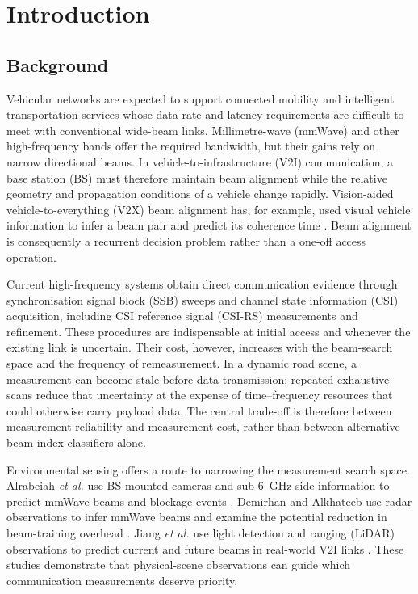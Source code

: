 \chapter{Introduction}
\label{ch:introduction}

\section{Background}
\label{sec:introduction-background}

Vehicular networks are expected to support connected mobility and intelligent
transportation services whose data-rate and latency requirements are difficult
to meet with conventional wide-beam links.  Millimetre-wave (mmWave) and other
high-frequency bands offer the required bandwidth, but their gains rely on
narrow directional beams.  In vehicle-to-infrastructure (V2I) communication, a
base station (BS) must therefore maintain beam alignment while the relative
geometry and propagation conditions of a vehicle change rapidly.  Vision-aided
vehicle-to-everything (V2X) beam alignment has, for example, used visual vehicle information to infer a
beam pair and predict its coherence time \cite{xu2022computervisionaidedmmwave}.
Beam alignment is consequently a recurrent decision problem rather than a
one-off access operation.

Current high-frequency systems obtain direct communication evidence through
synchronisation signal block (SSB) sweeps and channel state information (CSI)
acquisition, including CSI reference signal (CSI-RS) measurements and
refinement.  These procedures are indispensable at initial
access and whenever the existing link is uncertain.  Their cost, however,
increases with the beam-search space and the frequency of remeasurement.  In a
dynamic road scene, a measurement can become stale before data transmission;
repeated exhaustive scans reduce that uncertainty at the expense of
time--frequency resources that could otherwise carry payload data.  The central
trade-off is therefore between measurement reliability and measurement cost,
rather than between alternative beam-index classifiers alone.

Environmental sensing offers a route to narrowing the measurement search
space.  Alrabeiah \emph{et al.} use BS-mounted cameras and sub-6~GHz side
information to predict mmWave beams and blockage events
\cite{alrabeiah2019millimeterwavebasestations}.  Demirhan and Alkhateeb use
radar observations to infer mmWave beams and examine the potential reduction in
beam-training overhead \cite{demirhan2021radaraided6gbeam}.  Jiang \emph{et al.}
use light detection and ranging (LiDAR) observations to predict current and future beams in real-world V2I
links \cite{jiang2022lidaraidedfuturebeam}.  These studies demonstrate that
physical-scene observations can guide which communication measurements deserve
priority.

